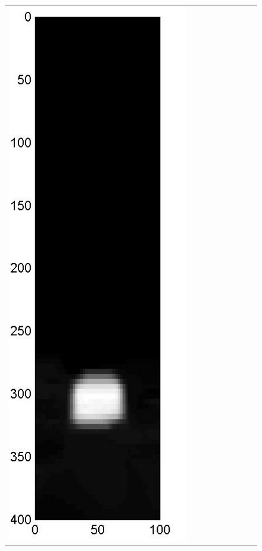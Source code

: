 \documentclass[11pt]{article}
\begin{document}
{\begin{figure}[!h]
\begin{center}
\begin{tabular}{|c|c|c|c|c|c|c|c|c|}
			\includegraphics[width=.9\iwidth]{figures/newFigs/noisy/resultsExp-7-mkTV}
			&

\end{tabular}
\end{center}
\end{figure}}
\end{document}
